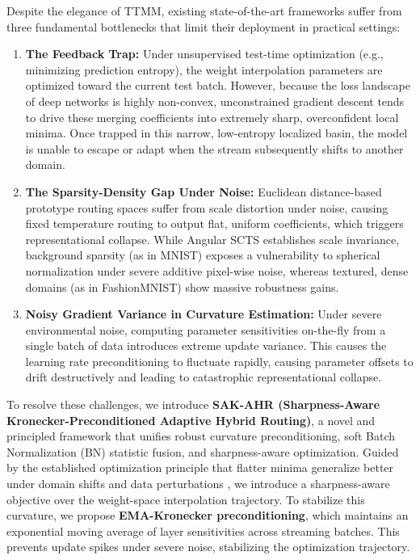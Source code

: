 \documentclass{article}
\theoremstyle{plain}
\theoremstyle{definition}
\theoremstyle{remark}
\begin{document}
Despite the elegance of TTMM, existing state-of-the-art frameworks suffer from three fundamental bottlenecks that limit their deployment in practical settings:
\begin{enumerate}
    \item \textbf{The Feedback Trap:} Under unsupervised test-time optimization (e.g., minimizing prediction entropy), the weight interpolation parameters are optimized toward the current test batch. However, because the loss landscape of deep networks is highly non-convex, unconstrained gradient descent tends to drive these merging coefficients into extremely sharp, overconfident local minima. Once trapped in this narrow, low-entropy localized basin, the model is unable to escape or adapt when the stream subsequently shifts to another domain.
    \item \textbf{The Sparsity-Density Gap Under Noise:} Euclidean distance-based prototype routing spaces suffer from scale distortion under noise, causing fixed temperature routing to output flat, uniform coefficients, which triggers representational collapse. While Angular SCTS establishes scale invariance, background sparsity (as in MNIST) exposes a vulnerability to spherical normalization under severe additive pixel-wise noise, whereas textured, dense domains (as in FashionMNIST) show massive robustness gains.
    \item \textbf{Noisy Gradient Variance in Curvature Estimation:} Under severe environmental noise, computing parameter sensitivities on-the-fly from a single batch of data introduces extreme update variance. This causes the learning rate preconditioning to fluctuate rapidly, causing parameter offsets to drift destructively and leading to catastrophic representational collapse.
\end{enumerate}

To resolve these challenges, we introduce \textbf{SAK-AHR (Sharpness-Aware Kronecker-Preconditioned Adaptive Hybrid Routing)}, a novel and principled framework that unifies robust curvature preconditioning, soft Batch Normalization (BN) statistic fusion, and sharpness-aware optimization. Guided by the established optimization principle that flatter minima generalize better under domain shifts and data perturbations \citep{foret2021sam}, we introduce a sharpness-aware objective over the weight-space interpolation trajectory. To stabilize this curvature, we propose \textbf{EMA-Kronecker preconditioning}, which maintains an exponential moving average of layer sensitivities across streaming batches. This prevents update spikes under severe noise, stabilizing the optimization trajectory.
\end{document}
